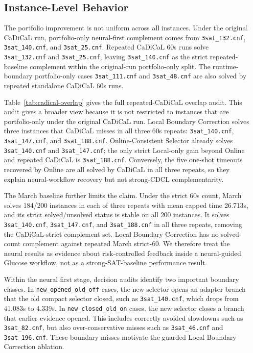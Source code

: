 \documentclass[11pt]{article}
\begin{document}
\subsection{Instance-Level Behavior}

The portfolio improvement is not uniform across all instances. Under the original CaDiCaL run, portfolio-only neural-first complement comes from \texttt{3sat\_132.cnf}, \texttt{3sat\_140.cnf}, and \texttt{3sat\_25.cnf}. Repeated CaDiCaL 60s runs solve \texttt{3sat\_132.cnf} and \texttt{3sat\_25.cnf}, leaving \texttt{3sat\_140.cnf} as the strict repeated-baseline complement within the original-run portfolio-only split. The runtime-boundary portfolio-only cases \texttt{3sat\_111.cnf} and \texttt{3sat\_48.cnf} are also solved by repeated standalone CaDiCaL 60s runs.

Table~\ref{tab:cadical-overlap} gives the full repeated-CaDiCaL overlap audit. This audit gives a broader view because it is not restricted to instances that are portfolio-only under the original CaDiCaL run. Local Boundary Correction solves three instances that CaDiCaL misses in all three 60s repeats: \texttt{3sat\_140.cnf}, \texttt{3sat\_147.cnf}, and \texttt{3sat\_188.cnf}. Online-Consistent Selector already solves \texttt{3sat\_140.cnf} and \texttt{3sat\_147.cnf}; the only strict Local-only gain beyond Online and repeated CaDiCaL is \texttt{3sat\_188.cnf}. Conversely, the five one-shot timeouts recovered by Online are all solved by CaDiCaL in all three repeats, so they explain neural-workflow recovery but not strong-CDCL complementarity.

The March baseline further limits the claim. Under the strict 60s count, March solves 184/200 instances in each of three repeats with mean capped time 26.713s, and its strict solved/unsolved status is stable on all 200 instances. It solves \texttt{3sat\_140.cnf}, \texttt{3sat\_147.cnf}, and \texttt{3sat\_188.cnf} in all three repeats, removing the CaDiCaL-strict complement set. Local Boundary Correction has no solved-count complement against repeated March strict-60. We therefore treat the neural results as evidence about risk-controlled feedback inside a neural-guided Glucose workflow, not as a strong-SAT-baseline performance result.

Within the neural first stage, decision audits identify two important boundary classes. In \texttt{new\_opened\_old\_off} cases, the new selector opens an adapter branch that the old compact selector closed, such as \texttt{3sat\_140.cnf}, which drops from 41.083s to 4.339s. In \texttt{new\_closed\_old\_on} cases, the new selector closes a branch that earlier evidence opened. This includes correctly avoided slowdowns such as \texttt{3sat\_82.cnf}, but also over-conservative misses such as \texttt{3sat\_46.cnf} and \texttt{3sat\_196.cnf}. These boundary misses motivate the guarded Local Boundary Correction ablation.
\end{document}
